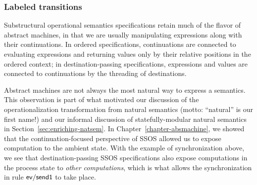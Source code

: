 \subsubsection{Labeled transitions}

Substructural operational semantics specifications retain much of the
flavor of abstract machines, in that we are usually manipulating
expressions along with their continuations. In ordered specifications,
continuations are connected to evaluating expressions and returning
values only by their relative positions in the ordered context; in
destination-passing specifications, expressions and values are
connected to continuations by the threading of destinations.

Abstract machines are not always the most natural
way to express a semantics. This observation is part of what
motivated our discussion of the operationalization transformation from
natural semantics (motto: ``natural'' is our first name!) 
and our informal
discussion of statefully-modular natural semantics in
Section~\ref{sec:enriching-natsem}.  In Chapter~\ref{chapter-absmachine}, 
we showed that the
continuation-focused perspective of SSOS allowed us to expose
computation to the ambient state. With the example of synchronization
above, we see that destination-passing SSOS specifications also expose
computations in the process state to {\it other computations}, which
is what allows the synchronization in rule ${\sf ev/send1}$ to take
place.

